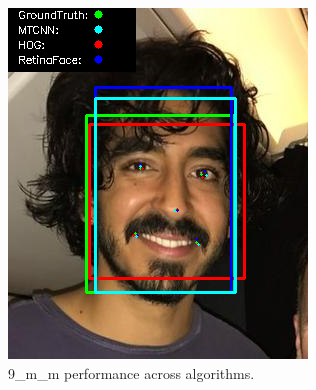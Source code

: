 \documentclass{l4proj}
\begin{document}
\begin{appendices}
\begin{figure}[h!]
\begin{minipage}{0.49\textwidth}
     \includegraphics[width=\textwidth]{images/appendix/9.png}
    \caption{9\_m\_m performance across algorithms.}
    \label{whoopi_result}
  \end{minipage}
\end{figure}


\end{appendices}
\end{document}
